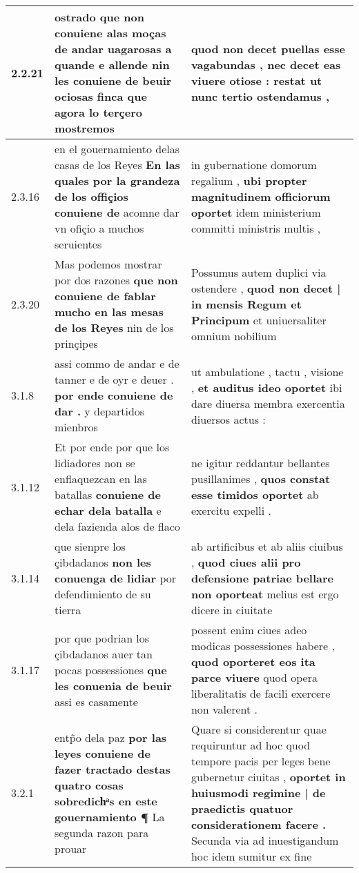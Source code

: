 \begin{tabular}{|p{1cm}|p{6.5cm}|p{6.5cm}|}
2.2.21 & ostrado que non conuiene alas moças de andar uagarosas a quande e allende \textbf{ nin les conuiene de beuir ociosas } finca que agora lo terçero mostremos & quod non decet puellas esse vagabundas , \textbf{ nec decet eas viuere otiose : } restat ut nunc tertio ostendamus , \\\hline
2.3.16 & en el gouernamiento delas casas de los Reyes \textbf{ En las quales por la grandeza de los offiçios conuiene de } acomne dar vn ofiçio a muchos seruientes & in gubernatione domorum regalium , \textbf{ ubi propter magnitudinem officiorum oportet } idem ministerium committi ministris multis , \\\hline
2.3.20 & Mas podemos mostrar por dos razones \textbf{ que non conuiene de fablar mucho en las mesas de los Reyes } nin de los prinçipes & Possumus autem duplici via ostendere , \textbf{ quod non decet | in mensis Regum et Principum } et uniuersaliter omnium nobilium \\\hline
3.1.8 & assi commo de andar e de tanner e de oyr e deuer . \textbf{ por ende conuiene de dar . } y departidos mienbros & ut ambulatione , tactu , visione , \textbf{ et auditus ideo oportet } ibi dare diuersa membra exercentia diuersos actus : \\\hline
3.1.12 & Et por ende por que los lidiadores non se enflaquezcan en las batallas \textbf{ conuiene de echar dela batalla } e dela fazienda alos de flaco & ne igitur reddantur bellantes pusillanimes , \textbf{ quos constat esse timidos oportet } ab exercitu expelli . \\\hline
3.1.14 & que sienpre los çibdadanos \textbf{ non les conuenga de lidiar } por defendimiento de su tierra & ab artificibus et ab aliis ciuibus , \textbf{ quod ciues alii pro defensione patriae bellare non oporteat } melius est ergo dicere in ciuitate \\\hline
3.1.17 & por que podrian los çibdadanos auer tan pocas possessiones \textbf{ que les conuenia de beuir } assi es casamente & possent enim ciues adeo modicas possessiones habere , \textbf{ quod oporteret eos ita parce viuere } quod opera liberalitatis de facili exercere non valerent . \\\hline
3.2.1 & entp̃o dela paz \textbf{ por las leyes conuiene de fazer tractado destas quatro cosas sobredichͣs en este gouernamiento ¶ } La segunda razon para prouar & Quare si considerentur quae requiruntur ad hoc quod tempore pacis per leges bene gubernetur ciuitas , \textbf{ oportet in huiusmodi regimine | de praedictis quatuor considerationem facere . } Secunda via ad inuestigandum hoc idem sumitur ex fine \\\hline

\end{tabular}
